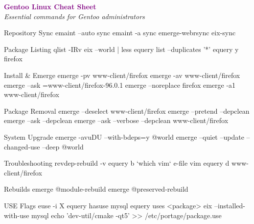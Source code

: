 \documentclass[10pt]{article}
\begin{document}
\pagestyle{empty}
\begin{center}
	{\Huge\textbf{\textcolor{purple}{Gentoo Linux Cheat Sheet}}}\\
	\vspace{5pt}
	{\small\textit{Essential commands for Gentoo administrators}}
\end{center}

\begin{multicols}{2}

\begin{cheatbox}{Repository Sync}
emaint --auto sync
emaint -a sync
emerge-webrsync
eix-sync
\end{cheatbox}

\begin{cheatbox}{Package Listing}
qlist -IRv
eix --world | less
equery list --duplicates '*'
equery y firefox
\end{cheatbox}

\begin{cheatbox}{Install \& Emerge}
emerge -pv www-client/firefox
emerge -av www-client/firefox
emerge --ask =www-client/firefox-96.0.1
emerge --noreplace firefox
emerge -a1 www-client/firefox
\end{cheatbox}

\begin{cheatbox}{Package Removal}
emerge --deselect www-client/firefox
emerge --pretend --depclean
emerge --ask --depclean
emerge --ask --verbose --depclean www-client/firefox
\end{cheatbox}

\begin{cheatbox}{System Upgrade}
emerge -avuDU --with-bdeps=y @world
emerge --quiet --update --changed-use --deep @world
\end{cheatbox}

\begin{cheatbox}{Troubleshooting}
revdep-rebuild -v
equery b `which vim`
e-file vim
equery d www-client/firefox
\end{cheatbox}

\begin{cheatbox}{Rebuilds}
emerge @module-rebuild
emerge @preserved-rebuild
\end{cheatbox}

\begin{cheatbox}{USE Flags}
euse -i X
equery hasuse mysql
equery uses <package>
eix --installed-with-use mysql
echo 'dev-util/cmake -qt5' >> /etc/portage/package.use
\end{cheatbox}


\end{multicols}
\end{document}
